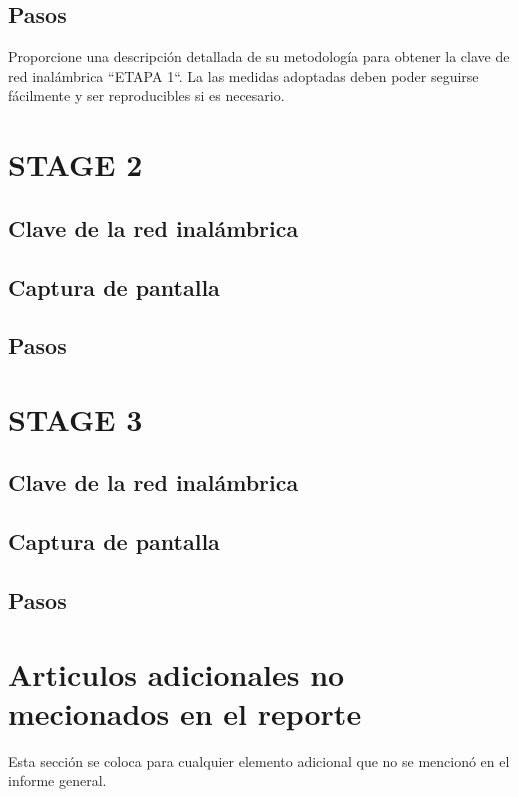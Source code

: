 \documentclass[titlepage,12pt]{article}
\begin{document}
\subsection{Pasos}
Proporcione una descripción detallada de su metodología para obtener la clave de red inalámbrica ``ETAPA 1``. La
las medidas adoptadas deben poder seguirse fácilmente y ser reproducibles si es necesario.


\section{STAGE 2}

\subsection{Clave de la red inalámbrica}
\subsection{Captura de pantalla}
\subsection{Pasos}

\newpage

\section{STAGE 3}

\subsection{Clave de la red inalámbrica}
\subsection{Captura de pantalla}
\subsection{Pasos}

\newpage

\section{Articulos adicionales no mecionados en el reporte}
Esta sección se coloca para cualquier elemento adicional que no se mencionó en el informe general.
\end{document}

